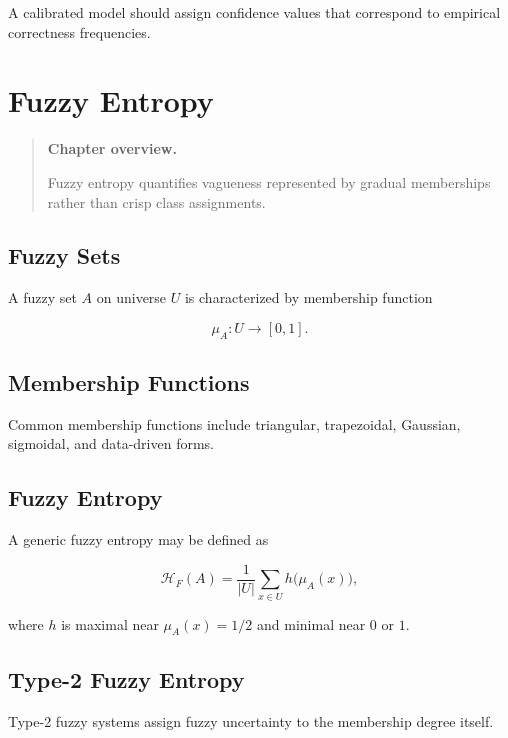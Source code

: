 \documentclass[11pt,oneside]{book}
\theoremstyle{remark}
\newcommand{\Entropy}{\mathcal{H}}
\newenvironment{chapteroverview}
{
	\begin{quote}
		\small
		\textbf{Chapter overview.}
	}
	{
	\end{quote}
}
\begin{document}
	A calibrated model should assign confidence values that correspond to empirical
	correctness frequencies.
	
	
	\chapter{Fuzzy Entropy}
	\label{chap:fuzzy-entropy}
	
	\begin{chapteroverview}
		Fuzzy entropy quantifies vagueness represented by gradual memberships rather
		than crisp class assignments.
	\end{chapteroverview}
	
	\section{Fuzzy Sets}
	
	A fuzzy set \(A\) on universe \(U\) is characterized by membership function
	
	\[
	\mu_A:U\rightarrow[0,1].
	\]
	
	\section{Membership Functions}
	
	Common membership functions include triangular, trapezoidal, Gaussian,
	sigmoidal, and data-driven forms.
	
	\section{Fuzzy Entropy}
	
	A generic fuzzy entropy may be defined as
	
	\[
	\Entropy_F(A)
	=
	\frac{1}{|U|}
	\sum_{x\in U}
	h\bigl(\mu_A(x)\bigr),
	\]
	
	where \(h\) is maximal near \(\mu_A(x)=1/2\) and minimal near \(0\) or \(1\).
	
	\section{Type-2 Fuzzy Entropy}
	
	Type-2 fuzzy systems assign fuzzy uncertainty to the membership degree itself.
	
\end{document}
